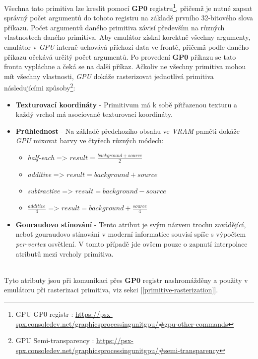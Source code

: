 Všechna tato primitiva lze kreslit pomocí \textbf{GP0} registru\footnote{GPU GP0 registr \cite{PSXSpec}: \url{https://psx-spx.consoledev.net/graphicsprocessingunitgpu/\#gpu-other-commands}}, 
přičemž je nutné zapsat správný počet argumentů do tohoto registru na základě prvního 32-bitového slova příkazu.
Počet argumentů daného primitiva závisí především na různých vlastnostech daného primitiva.
Aby emulátor získal korektně všechny argumenty, emulátor v \textit{GPU} interně uchovává příchozí data ve frontě, přičemž
podle daného příkazu očekává určitý počet argumentů. Po provedení \textbf{GP0} příkazu se tato fronta vypláchne a čeká se na další příkaz.
Ačkoliv ne všechny primitiva mohou mít všechny vlastnosti, \textit{GPU} dokáže rasterizovat jednotlivá primitiva následujícími způsoby\footnote{GPU Semi-transparency \cite{PSXSpec}: \url{https://psx-spx.consoledev.net/graphicsprocessingunitgpu/\#semi-transparency}}:\\[\baselineskip]
\begin{minipage}{\textwidth}
\begin{itemize}
\item{\textbf{Texturovací koordináty} - Primitivum má k sobě přiřazenou texturu a každý vrchol má asociované texturovací koordináty.}
\item{\textbf{Průhlednost} - Na základě předchozího obsahu ve \textit{VRAM} paměti dokáže \textit{GPU} mixovat barvy ve čtyřech různých módech:
    \begin{itemize}
        \item{\textit{half-each} => $result = \frac{background + source}{2}$}
        \item{\textit{additive} => $result = background + source$}
        \item{\textit{subtractive} => $result = background - source$}
        \item{\textit{$\frac{additive}{4}$} => $result = background + \frac{source}{4}$}
    \end{itemize}
}
\item{\textbf{Gouraudovo stínování} - Tento atribut je svým názvem trochu zavádějící, neboť gouraudovo stínování v moderní informatice souvisí spíše s výpočtem \textit{per-vertex} osvětlení. V tomto případě jde ovšem pouze o zapnutí interpolace atributů mezi vrcholy primitiva.}
\end{itemize}
\end{minipage}\\[\baselineskip]
Tyto atributy jsou při komunikaci přes \textbf{GP0} registr nashromážděny a použity v emulátoru při rasterizaci primitiva, viz sekci [\ref{primitive-rasterization}].

